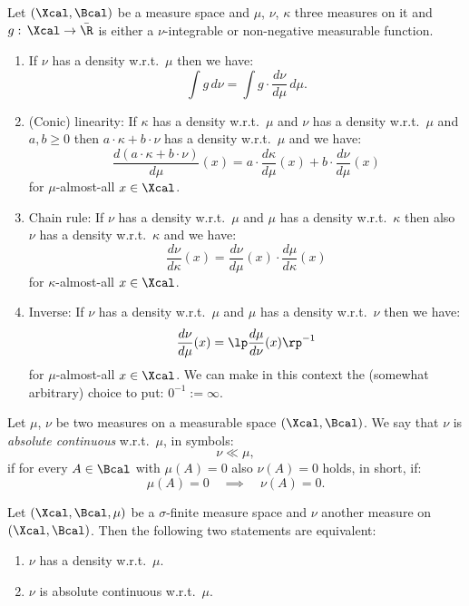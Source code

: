 \begin{Prp}
    Let $(\Xcal,\Bcal)$ be a measure space and $\mu$, $\nu$, $\kappa$ three measures on it and $g:\,\Xcal \to \bar\R$ is either  a $\nu$-integrable or non-negative measurable function. 
    \begin{enumerate}
        \item If $\nu$ has a density w.r.t.\ $\mu$ then we have:
                \[ \int g \,d\nu = \int g \cdot \frac{d\nu}{d\mu}\,d\mu.   \]
            \item (Conic) linearity: If $\kappa$ has a density w.r.t.\ $\mu$ and $\nu$ has a density w.r.t.\ $\mu$ and $a,b \ge0$ then $a \cdot \kappa+b \cdot \nu$ has a density w.r.t.\ $\mu$ and we have:
            \[ \frac{d(a \cdot \kappa+b\cdot \nu)}{d\mu}(x) = a\cdot\frac{d\kappa}{d\mu}(x) + b\cdot\frac{d\nu}{d\mu}(x) \]
             for $\mu$-almost-all $x \in \Xcal$.
      \item Chain rule: 
    If $\nu$ has a density w.r.t.\ $\mu$ and $\mu$ has a density w.r.t.\ $\kappa$ then also $\nu$ has a density w.r.t.\ $\kappa$ and we have:
    \[ \frac{d\nu}{d\kappa}(x) = \frac{d\nu}{d\mu}(x) \cdot \frac{d\mu}{d\kappa}(x) \]
    for $\kappa$-almost-all $x \in \Xcal$.
        \item Inverse:    If $\nu$ has a density w.r.t.\ $\mu$ and $\mu$ has a density w.r.t.\ $\nu$ then we have:
            \[ \frac{d\nu}{d\mu}(x) = \lp\frac{d\mu}{d\nu}(x) \rp^{-1}    \]
            for $\mu$-almost-all $x \in \Xcal$. We can make in this context the (somewhat arbitrary) choice to put: $0^{-1}:=\infty$.
    \end{enumerate}
\end{Prp}

\begin{Def}
    Let $\mu$, $\nu$ be two measures on a measurable space $(\Xcal,\Bcal)$.
    We say that $\nu$ is \emph{absolute continuous} w.r.t.\ $\mu$, in symbols:
    \[ \nu \ll \mu,\]
    if for every $A \in \Bcal$ with $\mu(A)=0$ also $\nu(A)=0$ holds, in short, if:
    \[ \mu(A)=0 \quad \implies \quad \nu(A)=0.\]
\end{Def}

\begin{Thm}
    \label{thm:radon-nikodym}
    Let $(\Xcal,\Bcal, \mu)$ be a $\sigma$-finite measure space and $\nu$ another measure on $(\Xcal,\Bcal)$.
    Then the following two statements are equivalent:
    \begin{enumerate}
        \item $\nu$ has a density w.r.t.\ $\mu$.
        \item $\nu$ is absolute continuous w.r.t.\ $\mu$.
    \end{enumerate}
\end{Thm}




